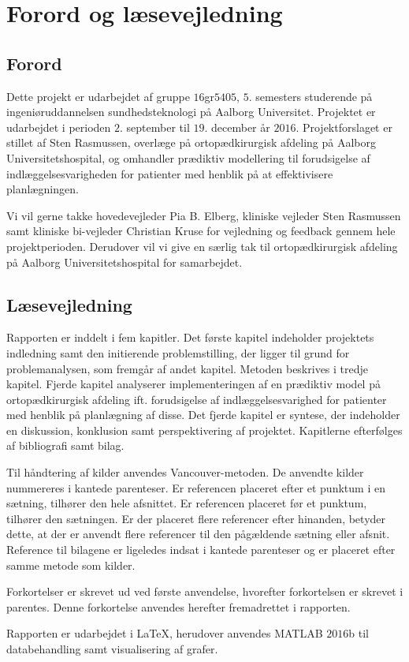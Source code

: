 \chapter*{Forord og læsevejledning}

\section*{Forord}
Dette projekt er udarbejdet af gruppe $16$gr$5405$, $5$. semesters studerende på ingeniøruddannelsen sundhedsteknologi på Aalborg Universitet. Projektet er udarbejdet i perioden $2$. september til $19$. december år $2016$. Projektforslaget er stillet af Sten Rasmussen, overlæge på ortopædkirurgisk afdeling på Aalborg Universitetshospital, og omhandler prædiktiv modellering til forudsigelse af indlæggelsesvarigheden for patienter med henblik på at effektivisere planlægningen. 


Vi vil gerne takke hovedevejleder Pia B. Elberg, kliniske vejleder Sten Rasmussen samt kliniske bi-vejleder Christian Kruse for vejledning og feedback gennem hele projektperioden. Derudover vil vi give en særlig tak til ortopædkirurgisk afdeling på Aalborg Universitetshospital for samarbejdet. 


\section*{Læsevejledning}
Rapporten er inddelt i fem kapitler. Det første kapitel indeholder projektets indledning samt den initierende problemstilling, der ligger til grund for problemanalysen, som fremgår af andet kapitel. Metoden beskrives i tredje kapitel. Fjerde kapitel analyserer implementeringen af en prædiktiv model på ortopædkirurgisk afdeling ift. forudsigelse af indlæggelsesvarighed for patienter med henblik på planlægning af disse. Det fjerde kapitel er syntese, der indeholder en diskussion, konklusion samt perspektivering af projektet. Kapitlerne efterfølges af bibliografi samt bilag. 


Til håndtering af kilder anvendes Vancouver-metoden. De anvendte kilder nummereres i kantede parenteser. Er referencen placeret efter et punktum i en sætning, tilhører den hele afsnittet. Er referencen placeret før et punktum, tilhører den sætningen. Er der placeret flere referencer efter hinanden, betyder dette, at der er anvendt flere referencer til den pågældende sætning eller afsnit. Reference til bilagene er ligeledes indsat i kantede parenteser og er placeret efter samme metode som kilder. 

Forkortelser er skrevet ud ved første anvendelse, hvorefter forkortelsen er skrevet i parentes. Denne forkortelse anvendes herefter fremadrettet i rapporten. 


Rapporten er udarbejdet i \LaTeX, herudover anvendes MATLAB $2016$b til databehandling samt visualisering af grafer. 
